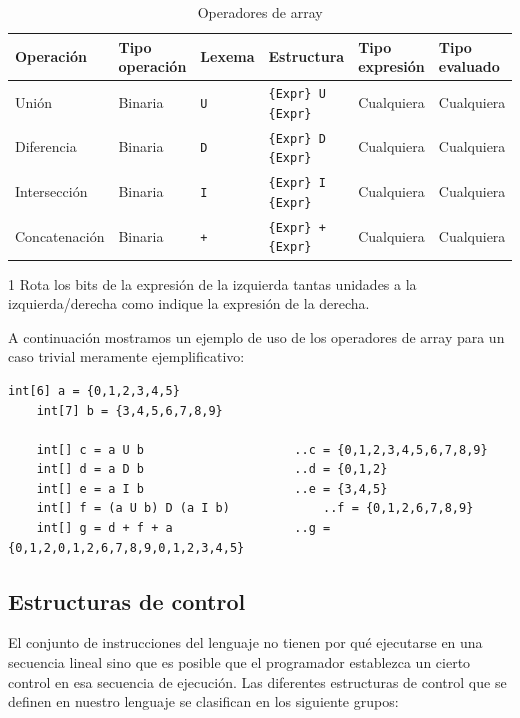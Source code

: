 \documentclass[11pt, english]{article}
\begin{document}
	\begin{table}[H]
		\begin{center}
			\caption{Operadores de array}\label{tab:array-op}
			\begin{threeparttable}
				\begin{tabular}{l|l|l|l|l|l}
					\toprule
					\textbf{Operación} & \textbf{Tipo operación} & \textbf{Lexema} & \textbf{Estructura} & \textbf{Tipo expresión} & \textbf{Tipo evaluado}\\
					\midrule
					Unión & Binaria & \texttt{U} & \texttt{\{Expr\} U \{Expr\}} & Cualquiera & Cualquiera\\
					Diferencia & Binaria & \texttt{D} & \texttt{\{Expr\} D \{Expr\}} & Cualquiera & Cualquiera\\
					Intersección & Binaria & \texttt{I} & \texttt{\{Expr\} I \{Expr\}} & Cualquiera & Cualquiera\\
					Concatenación & Binaria & \texttt{+} & \texttt{\{Expr\} + \{Expr\}} & Cualquiera & Cualquiera\\
					\bottomrule
				\end{tabular}
				\begin{tablenotes}
					\small
					\item[1] Rota los bits de la expresión de la izquierda tantas unidades a la izquierda/derecha como indique la expresión de la derecha.
				\end{tablenotes}
			\end{threeparttable}
		\end{center}
	\end{table}
	
	A continuación mostramos un ejemplo de uso de los operadores de array para un caso trivial meramente ejemplificativo:
	\begin{lstlisting}[caption=Ejemplo de uso de operadores de array]
	int[6] a = {0,1,2,3,4,5}
	int[7] b = {3,4,5,6,7,8,9}
	
	int[] c = a U b 					..c = {0,1,2,3,4,5,6,7,8,9}
	int[] d = a D b 					..d = {0,1,2}
	int[] e = a I b 					..e = {3,4,5}
	int[] f = (a U b) D (a I b) 			..f = {0,1,2,6,7,8,9}
	int[] g = d + f + a 				..g = {0,1,2,0,1,2,6,7,8,9,0,1,2,3,4,5}
	\end{lstlisting}
	
	\subsection{Estructuras de control}
	El conjunto de instrucciones del lenguaje no tienen por qué ejecutarse en una secuencia lineal sino que es posible que el programador establezca un cierto control en esa secuencia de ejecución. Las diferentes estructuras de control que se definen en nuestro lenguaje se clasifican en los siguiente grupos:
	
\end{document}
